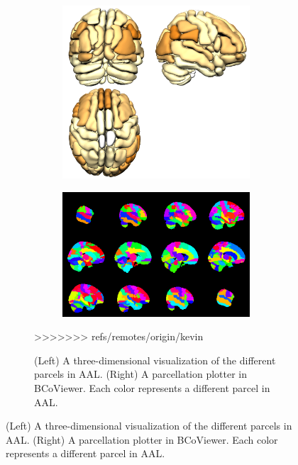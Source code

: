 \documentclass{nature}
\begin{document}
\begin{figure}[tb]
\begin{figure}
\centering
\begin{subfigure}{.5\textwidth}
  \centering
  \includegraphics[width=.9\linewidth]{fig/brainconductor/AAL_all.png}
\end{subfigure}%
\begin{subfigure}{.5\textwidth}
  \centering
 
\includegraphics[width=.9\linewidth]{fig/brainconductor/partition_aal_sagittal_2016-04-11.png}
\end{subfigure}
\caption{(Left) A three-dimensional visualization of the different parcels in
AAL. (Right) A parcellation plotter in BCoViewer. Each color represents a
different parcel in AAL.}
\label{fig:aal}
>>>>>>> refs/remotes/origin/kevin
\end{figure}


\end{figure}
\end{document}
